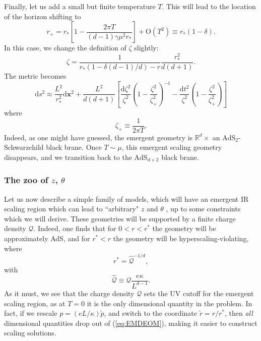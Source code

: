 \documentclass[10pt, oneside]{book}
\begin{document}
\begin{doublespace}
Finally, let us add a small but finite temperature $T$.   This will lead to the location of the horizon shifting to \begin{equation}
r_+ = r_*\left[1-\frac{2\pi T}{(d-1)\gamma \mu^2 r_*}\right]  + \mathrm{O}\left(T^2\right) \equiv r_*(1-\delta).
\end{equation}   In this case, we change the definition of $\zeta$ slightly:  \begin{equation}
\zeta = \frac{1}{r_*(1-\delta(d-1)/d)-r} \frac{r_*^2}{d(d+1)}.  \label{eq:zetafiniteT}
\end{equation}
The metric becomes \begin{equation}
\mathrm{d}s^2 \approx \frac{L^2}{r_*^{2}}\mathrm{d}\mathbf{x}^2 + \frac{L^2}{d(d+1)} \left[\frac{\mathrm{d}\zeta^2}{\zeta^2}\left(1-\frac{\zeta^2}{\zeta_+^2}\right)^{-1}  -\frac{\mathrm{d}t^2}{\zeta^2} \left(1-\frac{\zeta^2}{\zeta_+^2}\right)\right]
\end{equation}
where \begin{equation}
\zeta_+ \equiv \frac{1}{2\pi T}.
\end{equation}
Indeed, as one might have guessed,  the emergent geometry is $\mathbb{R}^d\times$ an $\mathrm{AdS}_2$-Schwarzchild black brane.   Once $T\sim \mu$,  this emergent scaling geometry disappears, and we transition back to the $\mathrm{AdS}_{d+2}$ black brane.

\subsubsection{The zoo of $z$, $\theta$} \label{sec:EMDgeom}
Let us now describe a simple family of models, which will have an emergent IR scaling region which can lead to ``arbitrary" $z$ and $\theta$ \cite{Huijse:2011ef}, up to some constraints which we will derive.   These geometries will be supported by a finite charge density $\mathcal{Q}$.   Indeed, one finds that for $0<r<r^*$ the geometry will be approximately AdS, and for $r^*<r$ the geometry will be hyperscaling-violating, where \begin{equation}
r^* = \hat{\mathcal{Q}}^{-1/d},
\end{equation}
with \begin{equation}
\hat{\mathcal{Q}} \equiv \mathcal{Q} \frac{e\kappa}{L^{d-1}}.
\end{equation}
As it must, we see that the charge density $\mathcal{Q}$ sets the UV cutoff for the emergent scaling region,  as at $T=0$ it is the only dimensional quantity in the problem.   In fact, if we rescale $p=(eL/\kappa)\tilde p$, and switch to the coordinate $\tilde r = r/r^*$,  then \emph{all} dimensional quantities drop out of (\ref{eq:EMDEOM}), making it easier to construct scaling solutions.


\end{doublespace}
\end{document}
